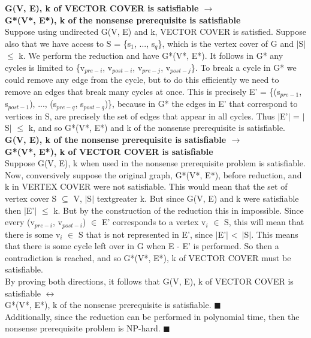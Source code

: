 \documentclass[10pt]{csc_assignment}
\begin{document}
\begin{description}
\textbf{G(V, E), k of VECTOR COVER is satisfiable $\rightarrow$ \\G*(V*, E*), k of the nonsense prerequisite is satisfiable}\\
Suppose using undirected G(V, E) and k, VECTOR COVER is satisfied. Suppose also that we have access to S = \{s$_{1}$, ..., s$_{q}$\}, which is the vertex cover of G and $\mid$S$\mid$ $\leqslant$ k. We perform the reduction and have G*(V*, E*). It follows in G* any cycles is limited to \{v$_{pre-i}$, v$_{post-i}$, v$_{pre-j}$, v$_{post-j}$\}. To break a cycle in G* we could remove any edge from the cycle, but to do this efficiently we need to remove an edges that break many cycles at once. This is precisely E' = \{(s$_{pre-1}$, s$_{post-1}$), ..., (s$_{pre-q}$, s$_{post-q}$)\}, because in G* the edges in E' that correspond to vertices in S, are precisely the set of edges that appear in all cycles. Thus $\mid$E'$\mid$ = $\mid$S$\mid$ $\leqslant$ k, and so G*(V*, E*) and k of the nonsense prerequisite is satisfiable.\\ 
\textbf{G(V, E), k of the nonsense prerequisite is satisfiable $\rightarrow$\\ G*(V*, E*), k of VECTOR COVER is satisfiable}\\
Suppose G(V, E), k when used in the nonsense prerequisite problem is satisfiable. Now, conversively suppose the original graph, G*(V*, E*), before reduction, and k in VERTEX COVER were not satisfiable. This would mean that the set of vertex cover S $\subseteq$ V, $\mid$S$\mid$ textgreater k. But since G(V, E) and k were satisfiable then $\mid$E'$\mid$ $\leqslant$ k. But by the construction of the reduction this in impossible. Since every (v$_{pre-i}$, v$_{post-i}$) $\in$ E' corresponds to a vertex v$_{i}$ $\in$ S, this will mean that there is some v$_{i}$ $\in$ S that is not represented in E', since $\mid$E'$\mid$ \textless ~$\mid$S$\mid$. This means that there is some cycle left over in G when E - E' is performed. So then a contradiction is reached, and so G*(V*, E*), k of VECTOR COVER must be satisfiable.\\

By proving both directions, it follows that G(V, E), k of VECTOR COVER is satisfiable $\leftrightarrow$ \\G*(V*, E*), k of the nonsense prerequisite is satisfiable. $\blacksquare$\\

Additionally, since the reduction can be performed in polynomial time, then the nonsense prerequisite problem is NP-hard. $\blacksquare$


\end{description}
\end{document}
